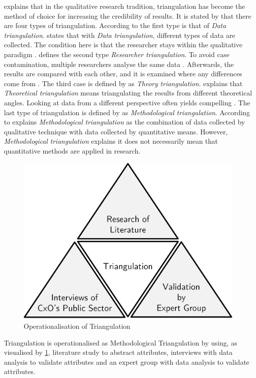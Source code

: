 \textcite[p.~481]{Mortelmans2018} explains that in the qualitative research tradition, \gls{triangulation} has become the method of choice for increasing the credibility of results. It is stated by \textcite[p.~481]{Mortelmans2018} that there are four types of \gls{triangulation}. According to \textcite[p.~88]{Mortelmans2018} the first type is that of \textit{Data \Gls{triangulation}}. \textcite[p.~481]{Mortelmans2018} states that with \textit{Data \Gls{triangulation}}, different types of data are collected. The condition here is that the researcher stays within the qualitative paradigm \parencite[p.~481]{Mortelmans2018}. \textcite[p.~481]{Mortelmans2018} defines the second type \textit{Researcher \Gls{triangulation}}. To avoid case contamination, multiple researchers analyse the same data \parencite[p.~482]{Mortelmans2018}. Afterwards, the results are compared with each other, and it is examined where any differences come from \parencite[p.~482]{Mortelmans2018}. The third case is defined by \textcite[p.~481]{Mortelmans2018} as \textit{Theory \Gls{triangulation}}. \textcite[p.~482]{Mortelmans2018} explains that \textit{Theoretical \Gls{triangulation}} means triangulating the results from different theoretical angles. Looking at data from a different perspective often yields compelling \parencite[p.~482]{Mortelmans2018}. The last type of \gls{triangulation} is defined by \textcite[p.~481]{Mortelmans2018} as \textit{Methodological \Gls{triangulation}}. According to \textcite[p.~483]{Mortelmans2018} explains \textit{Methodological \Gls{triangulation}} as the combination of data collected by qualitative technique with data collected by quantitative means. However, \textcite[p.~483]{Mortelmans2018}\textit{Methodological \Gls{triangulation}} explains it does not necessarily mean that quantitative methods are applied in research. 
\begin{figure}[H]
	\centering
	\includegraphics[width=0.5\linewidth]{images/triangulation}
	\caption[Operationalisation of Triangulation]{Operationalisation of Triangulation}
	\label{fig:triangulation}
\end{figure}
Triangulation is operationalised as Methodological Triangulation by using, as visualised by \cref{fig:triangulation}, literature study to abstract attributes, interviews with data analysis to validate attributes and an expert group with data analysis to validate attributes. 

